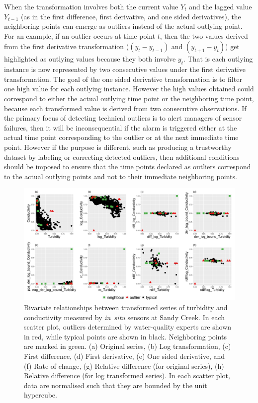 \documentclass[draft]{agujournal2018} %
\begin{document}
\color{black} When the transformation involves both the current value \(Y_{t}\) and
the lagged value \(Y_{t-1}\) (as in the first difference, first
derivative, and one sided derivatives), the neighboring points can
emerge as outliers instead of the actual outlying point. For an example,
if an outlier occurs at time point \(t\), then the two values derived
from the first derivative transformation (\((y_{t} - y_{t-1})\) and
\((y_{t+1}-y_{t})\)) get highlighted as outlying values because they both
involve \(y_{t}\). \color{black} That is each outlying instance is now represented by
two consecutive values under the first derivative transformation. The
goal of the one sided derivative transformation is to filter one high
value for each outlying instance. However the high values obtained could
correspond to either the actual outlying time point or the neighboring
time point, because each transformed value is derived from two
consecutive observations. If the primary focus of detecting technical
outliers is to alert managers of sensor failures, then it will be
inconsequential if the alarm is triggered either at the actual time
point corresponding to the outlier or at the next immediate time point.
However if the purpose is different, such as producing a trustworthy
dataset by labeling or correcting detected outliers, then additional
conditions should be imposed to ensure that the time points declared as
outliers correspond to the actual outlying points and not to their
immediate neighboring points.

\begin{figure}[H]

{\centering \includegraphics[width=1\linewidth]{./fig/transformType-1.pdf}

}

\caption{Bivariate relationships between transformed series of turbidity and conductivity measured by \textit{in~situ} sensors at Sandy Creek. In each scatter plot, outliers determined by water-quality experts are shown in red, while typical points are shown in black. \color{black} Neighboring points are marked in green. \color{black} (a) Original series, (b) Log transformation, (c) First difference, (d) First derivative, (e) One sided derivative, and (f) Rate of change, (g) Relative difference (for original series), (h) Relative difference (for log transformed series). \color{black}In each scatter plot, data are normalised such that they are bounded by the unit hypercube. \color{black}}\label{fig:transformTypePng}

\end{figure}
\end{document}

